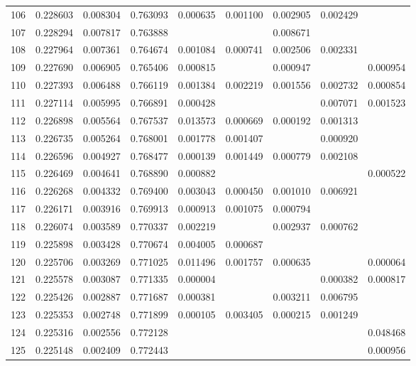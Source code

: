 \documentclass{elsarticle}
\begin{document}
\begin{center}
\begin{longtable}{|c|ccc|cccc|c|}
  106 & 0.228603 & 0.008304 & 0.763093 & 0.000635 & 0.001100 & 0.002905 & 0.002429 &  \\
  107 & 0.228294 & 0.007817 & 0.763888 &  &  & 0.008671 &  &  \\
  108 & 0.227964 & 0.007361 & 0.764674 & 0.001084 & 0.000741 & 0.002506 & 0.002331 &  \\
  109 & 0.227690 & 0.006905 & 0.765406 & 0.000815 &  & 0.000947 &  & 0.000954 \\
  110 & 0.227393 & 0.006488 & 0.766119 & 0.001384 & 0.002219 & 0.001556 & 0.002732 & 0.000854 \\
  111 & 0.227114 & 0.005995 & 0.766891 & 0.000428 &  &  & 0.007071 & 0.001523 \\
  112 & 0.226898 & 0.005564 & 0.767537 & 0.013573 & 0.000669 & 0.000192 & 0.001313 &  \\
  113 & 0.226735 & 0.005264 & 0.768001 & 0.001778 & 0.001407 &  & 0.000920 &  \\
  114 & 0.226596 & 0.004927 & 0.768477 & 0.000139 & 0.001449 & 0.000779 & 0.002108 &  \\
  115 & 0.226469 & 0.004641 & 0.768890 & 0.000882 &  &  &  & 0.000522 \\
  116 & 0.226268 & 0.004332 & 0.769400 & 0.003043 & 0.000450 & 0.001010 & 0.006921 &  \\
  117 & 0.226171 & 0.003916 & 0.769913 & 0.000913 & 0.001075 & 0.000794 &  &  \\
  118 & 0.226074 & 0.003589 & 0.770337 & 0.002219 &  & 0.002937 & 0.000762 &  \\
  119 & 0.225898 & 0.003428 & 0.770674 & 0.004005 & 0.000687 &  &  &  \\
  120 & 0.225706 & 0.003269 & 0.771025 & 0.011496 & 0.001757 & 0.000635 &  & 0.000064 \\
  121 & 0.225578 & 0.003087 & 0.771335 & 0.000004 &  &  & 0.000382 & 0.000817 \\
  122 & 0.225426 & 0.002887 & 0.771687 & 0.000381 &  & 0.003211 & 0.006795 &  \\
  123 & 0.225353 & 0.002748 & 0.771899 & 0.000105 & 0.003405 & 0.000215 & 0.001249 &  \\
  124 & 0.225316 & 0.002556 & 0.772128 &  &  &  &  & 0.048468 \\
  125 & 0.225148 & 0.002409 & 0.772443 &  &  &  &  & 0.000956
\label{tab:data}
\end{longtable}
\end{center}
\end{document}
